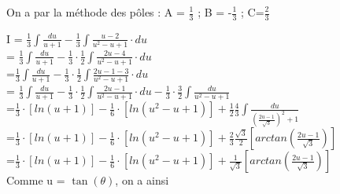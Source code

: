 \documentclass[a4paper,10pt]{article}
\begin{document}
On a par la méthode des pôles :  A = $\frac{1}{3}$ ; B = -$\frac{1}{3}$ ; C=$\frac{2}{3}$

\parindent=0cm
I = $\frac{1}{3} \int \frac{du}{u+1} - \frac{1}{3} \int \frac{u-2}{u^2-u+1} \cdot du$ \\
= $\frac{1}{3} \int \frac{du}{u+1} - \frac{1}{3} \cdot \frac{1}{2} \int \frac{2u-4}{u^2-u+1} \cdot du$ \\
=$ \frac{1}{3} \int \frac{du}{u+1} - \frac{1}{3} \cdot \frac{1}{2} \int \frac{2u-1-3}{u^2-u+1} \cdot du$ \\
= $\frac{1}{3} \int \frac{du}{u+1} - \frac{1}{3} \cdot \frac{1}{2} \int \frac{2u-1}{u^2-u+1} \cdot du - \frac{1}{3} \cdot \frac{3}{2} \int \frac{du}{u^2-u+1}$\\
=$\frac{1}{3} \cdot \left[ ln(u+1) \right] - \frac{1}{6} \cdot \left[ ln(u^2-u+1) \right] + \frac{1}{2} \frac{4}{3} \int \frac{du}{(\frac{2u-1}{\sqrt{3}})^2+1}  $ \\
=$\frac{1}{3} \cdot \left[ ln(u+1) \right] - \frac{1}{6} \cdot \left[ ln(u^2-u+1) \right] + \frac{2}{3} \frac{\sqrt{3}}{2} \left[ arctan(\frac{2u-1}{\sqrt{3}}) \right] $ \\
=$\frac{1}{3} \cdot \left[ ln(u+1) \right] - \frac{1}{6} \cdot \left[ ln(u^2-u+1) \right] + \frac{1}{\sqrt{3}} \left[ arctan(\frac{2u-1}{\sqrt{3}}) \right] $ \\
Comme u = $\tan(\theta)$, on a ainsi 
\begin{center}
\end{center}
\end{document}
